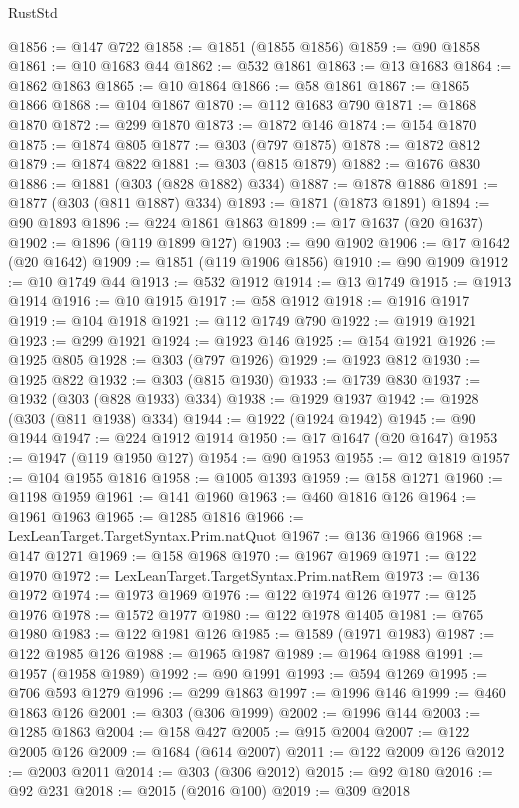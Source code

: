 \begin{lexlean}{RustStd}
\begin{coremodule}
@1856 := @147 @722
@1858 := @1851 (@1855 @1856)
@1859 := @90 @1858
@1861 := @10 @1683 @44
@1862 := @532 @1861
@1863 := @13 @1683
@1864 := @1862 @1863
@1865 := @10 @1864
@1866 := @58 @1861
@1867 := @1865 @1866
@1868 := @104 @1867
@1870 := @112 @1683 @790
@1871 := @1868 @1870
@1872 := @299 @1870
@1873 := @1872 @146
@1874 := @154 @1870
@1875 := @1874 @805
@1877 := @303 (@797 @1875)
@1878 := @1872 @812
@1879 := @1874 @822
@1881 := @303 (@815 @1879)
@1882 := @1676 @830
@1886 := @1881 (@303 (@828 @1882) @334)
@1887 := @1878 @1886
@1891 := @1877 (@303 (@811 @1887) @334)
@1893 := @1871 (@1873 @1891)
@1894 := @90 @1893
@1896 := @224 @1861 @1863
@1899 := @17 @1637 (@20 @1637)
@1902 := @1896 (@119 @1899 @127)
@1903 := @90 @1902
@1906 := @17 @1642 (@20 @1642)
@1909 := @1851 (@119 @1906 @1856)
@1910 := @90 @1909
@1912 := @10 @1749 @44
@1913 := @532 @1912
@1914 := @13 @1749
@1915 := @1913 @1914
@1916 := @10 @1915
@1917 := @58 @1912
@1918 := @1916 @1917
@1919 := @104 @1918
@1921 := @112 @1749 @790
@1922 := @1919 @1921
@1923 := @299 @1921
@1924 := @1923 @146
@1925 := @154 @1921
@1926 := @1925 @805
@1928 := @303 (@797 @1926)
@1929 := @1923 @812
@1930 := @1925 @822
@1932 := @303 (@815 @1930)
@1933 := @1739 @830
@1937 := @1932 (@303 (@828 @1933) @334)
@1938 := @1929 @1937
@1942 := @1928 (@303 (@811 @1938) @334)
@1944 := @1922 (@1924 @1942)
@1945 := @90 @1944
@1947 := @224 @1912 @1914
@1950 := @17 @1647 (@20 @1647)
@1953 := @1947 (@119 @1950 @127)
@1954 := @90 @1953
@1955 := @12 @1819
@1957 := @104 @1955 @1816
@1958 := @1005 @1393
@1959 := @158 @1271
@1960 := @1198 @1959
@1961 := @141 @1960
@1963 := @460 @1816 @126
@1964 := @1961 @1963
@1965 := @1285 @1816
@1966 := LexLeanTarget.TargetSyntax.Prim.natQuot
@1967 := @136 @1966
@1968 := @147 @1271
@1969 := @158 @1968
@1970 := @1967 @1969
@1971 := @122 @1970
@1972 := LexLeanTarget.TargetSyntax.Prim.natRem
@1973 := @136 @1972
@1974 := @1973 @1969
@1976 := @122 @1974 @126
@1977 := @125 @1976
@1978 := @1572 @1977
@1980 := @122 @1978 @1405
@1981 := @765 @1980
@1983 := @122 @1981 @126
@1985 := @1589 (@1971 @1983)
@1987 := @122 @1985 @126
@1988 := @1965 @1987
@1989 := @1964 @1988
@1991 := @1957 (@1958 @1989)
@1992 := @90 @1991
@1993 := @594 @1269
@1995 := @706 @593 @1279
@1996 := @299 @1863
@1997 := @1996 @146
@1999 := @460 @1863 @126
@2001 := @303 (@306 @1999)
@2002 := @1996 @144
@2003 := @1285 @1863
@2004 := @158 @427
@2005 := @915 @2004
@2007 := @122 @2005 @126
@2009 := @1684 (@614 @2007)
@2011 := @122 @2009 @126
@2012 := @2003 @2011
@2014 := @303 (@306 @2012)
@2015 := @92 @180
@2016 := @92 @231
@2018 := @2015 (@2016 @100)
@2019 := @309 @2018

\end{coremodule}
\end{lexlean}
